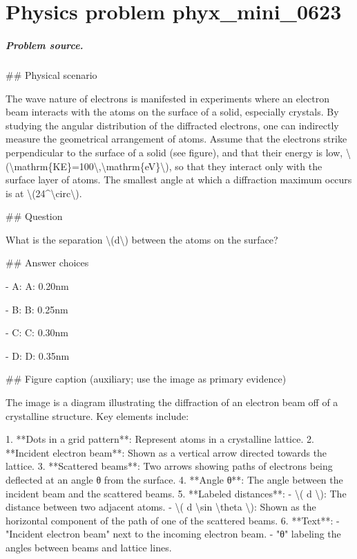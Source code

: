 
\chapter{Physics problem phyx\_mini\_0623}
\label{ch:PhyXMiniProblems_problem_phyx_mini_0623}

\paragraph{Problem source.}
\#\# Physical scenario

The wave nature of electrons is manifested in experiments where an electron beam interacts with the atoms on the surface of a solid, especially crystals. By studying the angular distribution of the diffracted electrons, one can indirectly measure the geometrical arrangement of atoms. Assume that the electrons strike perpendicular to the surface of a solid (see figure), and that their energy is low, \textbackslash{}(\textbackslash{}mathrm\{KE\}=100\textbackslash{},\textbackslash{}mathrm\{eV\}\textbackslash{}), so that they interact only with the surface layer of atoms. The smallest angle at which a diffraction maximum occurs is at \textbackslash{}(24\textasciicircum{}\textbackslash{}circ\textbackslash{}).

\#\# Question

What is the separation \textbackslash{}(d\textbackslash{}) between the atoms on the surface?

\#\# Answer choices

- A: A: 0.20nm

- B: B: 0.25nm

- C: C: 0.30nm

- D: D: 0.35nm

\#\# Figure caption (auxiliary; use the image as primary evidence)

The image is a diagram illustrating the diffraction of an electron beam off of a crystalline structure. Key elements include:

1. **Dots in a grid pattern**: Represent atoms in a crystalline lattice.
2. **Incident electron beam**: Shown as a vertical arrow directed towards the lattice.
3. **Scattered beams**: Two arrows showing paths of electrons being deflected at an angle θ from the surface.
4. **Angle θ**: The angle between the incident beam and the scattered beams.
5. **Labeled distances**: 
   - \textbackslash{}( d \textbackslash{}): The distance between two adjacent atoms.
   - \textbackslash{}( d \textbackslash{}sin \textbackslash{}theta \textbackslash{}): Shown as the horizontal component of the path of one of the scattered beams.
6. **Text**:
   - "Incident electron beam" next to the incoming electron beam.
   - "θ" labeling the angles between beams and lattice lines.

